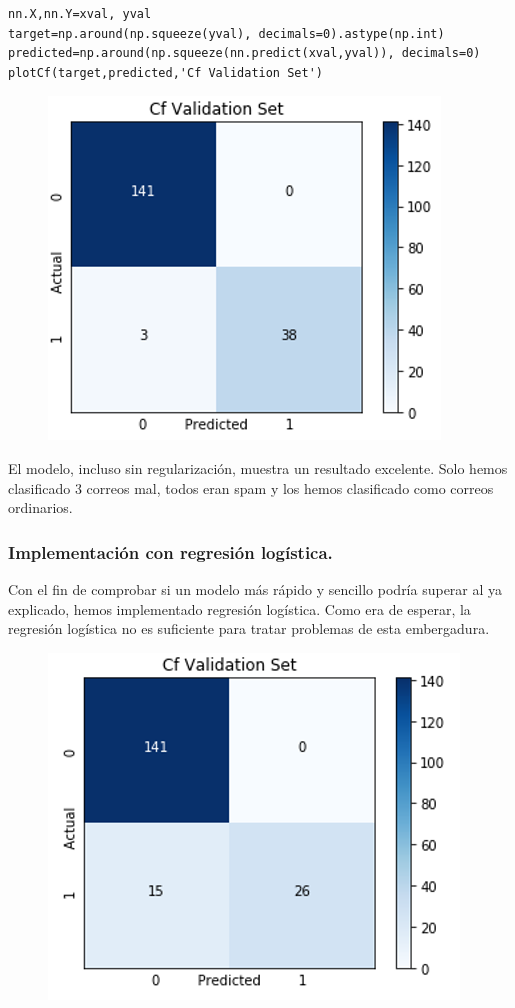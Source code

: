 \documentclass[a4paper,10pt]{article}
\begin{document}
\begin{lstlisting}
nn.X,nn.Y=xval, yval 
target=np.around(np.squeeze(yval), decimals=0).astype(np.int)
predicted=np.around(np.squeeze(nn.predict(xval,yval)), decimals=0)
plotCf(target,predicted,'Cf Validation Set')
\end{lstlisting}
\begin{figure}[H]
\centering
\includegraphics[scale=0.8]{Annotation 2020-03-23 190419}
\end{figure}
El modelo, incluso sin regularización, muestra un resultado excelente. Solo hemos clasificado 3 correos mal, todos eran spam y los hemos clasificado como correos ordinarios.

\subsubsection{Implementación con regresión logística.}
Con el fin de comprobar si un modelo más rápido y sencillo podría superar al ya explicado, hemos implementado regresión logística. Como era de esperar, la regresión logística no es suficiente para tratar problemas de esta embergadura.
\begin{figure}[H]
\centering
\includegraphics[scale=0.8]{Annotation 2020-03-23 193133.png}
\end{figure}
\newpage
\end{document}
